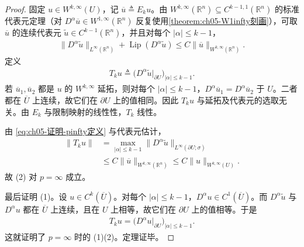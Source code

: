 \documentclass[../../main.tex]{subfiles}%
\begin{document}
\begin{proof}
固定 $u\in W^{k,\infty}(U)$，记 $\overline{u}\triangleq E_{k}u$。由 $W^{k,\infty}(\mathbb{R}^{n})\subseteq C^{k-1,1}(\mathbb{R}^{n})$ 的标准代表元定理（对 $D^{\alpha}\overline{u}\in W^{1,\infty}(\mathbb{R}^{n})$ 反复使用\cref{theorem:ch05-W1infty刻画}），可取 $\overline{u}$ 的连续代表元 $\widetilde{u}\in C^{k-1}(\mathbb{R}^{n})$，并且对每个 $|\alpha|\leqslant k-1$，
\begin{align*}
\|D^{\alpha}\widetilde{u}\|_{L^{\infty}(\mathbb{R}^{n})}
+\operatorname{Lip}(D^{\alpha}\widetilde{u})
\leqslant C\|\overline{u}\|_{W^{k,\infty}(\mathbb{R}^{n})}.
\end{align*}
定义
\begin{align}
T_{k}u\triangleq\bigl(D^{\alpha}\widetilde{u}|_{\partial U}\bigr)_{|\alpha|\leqslant k-1}.
\label{eq:ch05-证明-pinfty定义}
\end{align}
若 $\overline{u}_{1},\overline{u}_{2}$ 都是 $u$ 的 $W^{k,\infty}$ 延拓，则对每个 $|\alpha|\leqslant k-1$，$D^{\alpha}\overline{u}_{1}=D^{\alpha}\overline{u}_{2}$ 于 $U$。二者都在 $\overline{U}$ 上连续，故它们在 $\partial U$ 上的值相同。因此 $T_{k}u$ 与延拓及代表元的选取无关。由 $E_{k}$ 与限制映射的线性性，$T_{k}$ 线性。

由 \eqref{eq:ch05-证明-pinfty定义} 与代表元估计，
\begin{align*}
\|T_{k}u\|
&=
\max_{|\alpha|\leqslant k-1}
\|D^{\alpha}\widetilde{u}\|_{L^{\infty}(\partial U;\sigma)}\\
&\leqslant
C\|\overline{u}\|_{W^{k,\infty}(\mathbb{R}^{n})}
\leqslant
C\|u\|_{W^{k,\infty}(U)}.
\end{align*}
故 (2) 对 $p=\infty$ 成立。

最后证明 (1)。设 $u\in C^{k}(\overline{U})$。对每个 $|\alpha|\leqslant k-1$，$D^{\alpha}u\in C^{1}(\overline{U})$。而 $D^{\alpha}\widetilde{u}$ 与 $D^{\alpha}u$ 都在 $\overline{U}$ 上连续，且在 $U$ 上相等，故它们在 $\partial U$ 上的值相等。于是
\begin{align*}
T_{k}u=\bigl(D^{\alpha}u|_{\partial U}\bigr)_{|\alpha|\leqslant k-1}.
\end{align*}
这就证明了 $p=\infty$ 时的 (1)(2)。定理证毕。
\end{proof}
\end{document}
